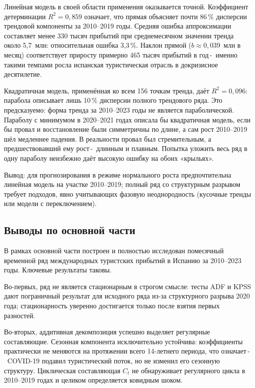 \documentclass[a4paper,14pt]{extarticle}
\newcommand{\dash}{\,-~}
\begin{document}
Линейная модель в своей области применения оказывается
точной. Коэффициент детерминации $R^{2} = 0{,}859$ означает,
что прямая объясняет почти 86\,\% дисперсии трендовой компоненты
за 2010–2019 годы. Средняя ошибка аппроксимации составляет
менее 330 тысяч прибытий при среднемесячном значении тренда
около 5,7~млн: относительная ошибка 3,3\,\%. Наклон прямой
($b \approx 0{,}039$~млн в месяц) соответствует приросту примерно
465 тысяч прибытий в год\dash именно такими темпами росла
испанская туристическая отрасль в докризисное десятилетие.

Квадратичная модель, применённая ко всем 156 точкам тренда,
даёт $R^{2} = 0{,}096$: парабола описывает лишь 10\,\% дисперсии
полного трендового ряда. Это предсказуемо: форма тренда за
2010–2023 годы не является параболической. Параболу с минимумом
в 2020–2021 годах описала бы квадратичная модель, если бы провал
и восстановление были симметричны по длине, а сам рост 2010–2019
шёл медленнее падения. В реальности провал был стремительным,
а предшествовавший ему рост\dash длинным и плавным. Попытка
уложить весь ряд в одну параболу неизбежно даёт высокую ошибку
на обоих «крыльях».

Вывод: для прогнозирования в режиме нормального роста
предпочтительна линейная модель на участке 2010–2019;
полный ряд со структурным разрывом требует подходов,
явно учитывающих фазовую неоднородность (кусочные тренды
или модели с переключением).

\subsection{Выводы по основной части}
В рамках основной части построен и полностью исследован
помесячный временной ряд международных туристских прибытий
в Испанию за 2010–2023 годы. Ключевые результаты таковы.

Во-первых, ряд не является стационарным в строгом смысле:
тесты ADF и KPSS дают пограничный результат для исходного
ряда из-за структурного разрыва 2020 года; стационарность
уверенно достигается только после взятия первых разностей.

Во-вторых, аддитивная декомпозиция успешно выделяет регулярные
составляющие. Сезонная компонента исключительно устойчива:
коэффициенты практически не меняются на протяжении
всего 14-летнего периода, что означает\dash COVID-19 подавил
туристический поток, но не изменил его сезонную структуру.
Циклическая составляющая $C_t$ не обнаруживает регулярного
цикла в 2010–2019 годах и целиком определяется ковидным шоком.
\end{document}
